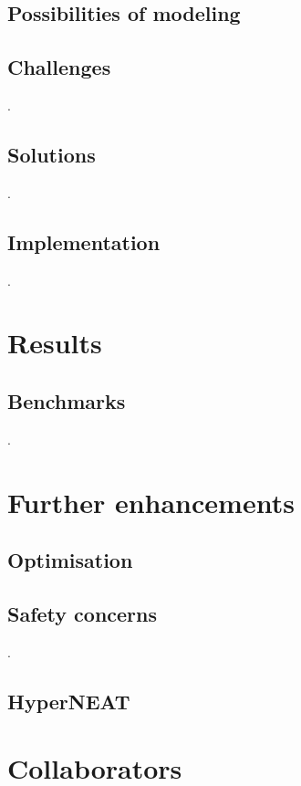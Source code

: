 \documentclass[11pt]{article}
\begin{document}
		\subsection{Possibilities of modeling}
			
		\subsection{Challenges}
			.
		\subsection{Solutions}
			.
		\subsection{Implementation}
			.
	\newpage

	\section{Results}
		\subsection{Benchmarks}
			.
	\newpage

	\section{Further enhancements}
		\subsection{Optimisation}
			
		\subsection{Safety concerns}
			.
		\subsection{HyperNEAT}
			
	\newpage

	\section{Collaborators}
		
	\newpage

	\nocite{*}
	
	
\end{document}
